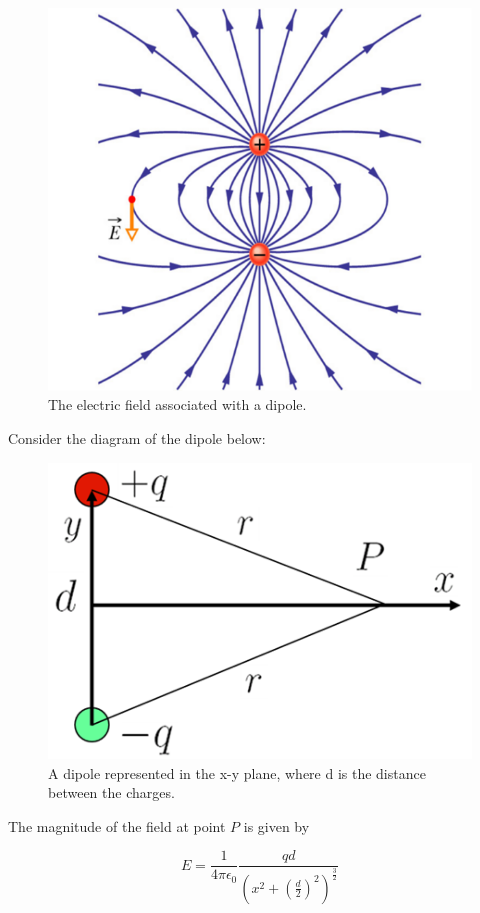 \documentclass[
]{book}
\begin{document}
\begin{figure}

{\centering \includegraphics[width=0.7\linewidth]{Figures/dipole_field} 

}

\caption{The electric field associated with a dipole.}\label{fig:dipoleField}
\end{figure}

Consider the diagram of the dipole below:

\begin{figure}

{\centering \includegraphics[width=0.7\linewidth]{Figures/dipole_diagram} 

}

\caption{A dipole represented in the x-y plane, where d is the distance between the charges.}\label{fig:dipoleDiagram}
\end{figure}

The magnitude of the field at point \(P\) is given by

\begin{equation}
\label{eq:fieldatP}
E = \frac{1}{4 \pi \epsilon_0} \frac{qd}{\left( x^2 + \left( \frac{d}{2} \right)^2 \right)^{\frac{3}{2}}}
\end{equation}
\end{document}
